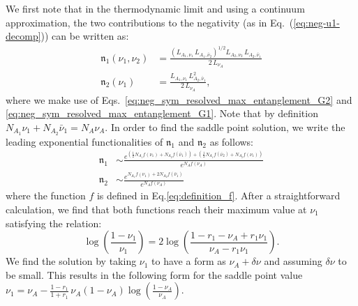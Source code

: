 \documentclass[aps,pra,reprint,superscriptaddress,twocolumn,notitlepage]{revtex4-1}
\numberwithin{equation}{section}
\begin{document}
We first note that in the thermodynamic limit and using a continuum approximation, the two contributions to the negativity (as in Eq.~(\ref{eq:neg-u1-decomp})) can be written as:
\begin{equation}\label{eq:negativity_saddle}
\begin{aligned}
    \mathfrak{n}_{1}(\nu_1,\nu_2) & =  \frac{ \left(L_{A_1,\nu_1} \, L_{A_1,\bar{\nu}_2}  \right)^{1/2} 
    L_{A_2,\nu_2} \, L_{A_2,\bar{\nu}_1}
    }{2 \, L_{\nu_A}} \\
    \mathfrak{n}_{2}(\nu_1) & =   \frac{ L_{A_1,\nu_1} \,
    L_{A_2,\bar{\nu}_1}^2
    }{2 \, L_{\nu_A}}  ,
\end{aligned}    
\end{equation}
where we make use of Eqs.~\eqref{eq:neg_sym_resolved_max_entanglement_G2} and \eqref{eq:neg_sym_resolved_max_entanglement_G1}. Note that by definition $N_{A_1} \nu_1 + N_{A_2}\bar\nu_1 = N_A \nu_A$. In order to find the saddle point solution, we write the leading exponential functionalities of $\mathfrak{n}_{1}$ and $\mathfrak{n}_{2}$ as follows:
\begin{equation}
\begin{aligned}
    \mathfrak{n}_{1} &\sim  
    \frac{
    e^{\left( \frac12 N_{A_1} f(\nu_1) + N_{A_2} f(\bar\nu_1) \right) +
    \left( \frac12 N_{A_1} f(\bar\nu_2) + N_{A_2} f(\nu_1) \right)}
    }{
    e^{N_A f(\nu_A)}
    }
    \\
    \mathfrak{n}_{2} &\sim 
    \frac{
    e^{N_{A_1} f(\nu_1) + 2 N_{A_2} f(\bar\nu_1)}
    }{
    e^{N_A f(\nu_A)}
    }
\end{aligned}
\end{equation}
where the function $f$ is defined in Eq.\eqref{eq:definition_f}. After a straightforward calculation, we find that both functions reach their maximum value at $\nu_1$ satisfying the relation:
\begin{equation}
    \log\left( \frac{1-\nu_1}{\nu_1}  \right)  = 2 \log \left( \frac{1-r_1 -  \nu_A +r_1 \nu_1}{ \nu_A - r_1 \nu_1}  \right).
\end{equation}
We find the solution by taking $\nu_1$ to have a form as $\nu_A + \delta \nu$ and assuming $\delta \nu $ to be small. This results in the following form for the saddle point value $\nu_1 = \nu_A - %
\frac{1-r_1}{1+r_1} \, \nu_A (1-\nu_A) \log(\frac{1-\nu_A}{\nu_A})$. 
\end{document}
